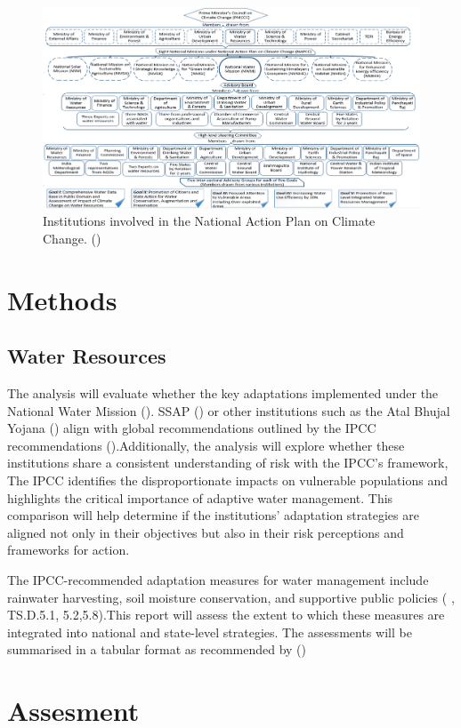 \documentclass[12pt]{article}
\begin{document}
\begin{figure}[h]
  \centering
  \includegraphics[width = \textwidth]{NAPCC_india.jpg}
  \caption{Institutions involved in the National Action Plan on Climate Change. (\cite{azohani_2017})}
\end{figure}




\section*{Methods}
\subsection*{Water Resources}
The analysis will evaluate whether the key adaptations implemented under the National Water Mission (\cite{napcc_2008}).
SSAP (\cite{SSAP_2015}) or other institutions such as the Atal Bhujal Yojana (\cite{nandakumaran_2020}) align with 
global recommendations outlined by the IPCC recommendations (\cite{ipcc_climate_2023}).Additionally, the analysis will 
explore whether these institutions share a consistent understanding of risk with the IPCC’s framework, The IPCC identifies 
the disproportionate impacts on vulnerable populations and highlights the critical importance of adaptive water management. 
This comparison will help determine if the institutions' adaptation strategies are aligned not only in their objectives but 
also in their risk perceptions and frameworks for action.

The IPCC-recommended adaptation measures for water management include rainwater harvesting, soil moisture conservation, 
and supportive public policies (\cite{ipcc_climate_2023} , TS.D.5.1, 5.2,5.8).This report will assess the extent to 
which these measures are integrated into national and state-level strategies. The assessments will be summarised in 
a tabular format as recommended by (\cite{craft_2016})



\section*{Assesment}
\end{document}
